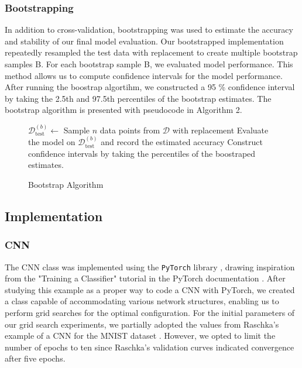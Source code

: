 \subsubsection{Bootstrapping}

In addition to cross-validation, bootstrapping was used to estimate the accuracy and stability of our final model evaluation. Our bootstrapped implementation repeatedly resampled the test data with replacement to create multiple bootstrap samples B. For each bootstrap sample B, we evaluated model performance. This method allows us to compute confidence intervals for the model performance. After running the boostrap algortihm, we constructed a 95 \% confidence interval by taking the 2.5th and 97.5th percentiles of the bootstrap estimates. The bootstrap algorithm is presented with pseudocode in Algorithm 2. \cite{hastie2009elements}

\begin{figure}[H]
    \begin{algorithm}[H]
    \caption{Bootstrap Algorithm}
    \label{algo:bootstrap}
        \begin{algorithmic}[1]
                \State $\mathcal{D}^{(b)}_{\text{test}} \gets$ Sample $n$ data points from $\mathcal{D}$ with replacement
                \State Evaluate the model on $\mathcal{D}^{(b)}_{\text{test}}$ and record the estimated accuracy
            \EndFor
            \State Construct confidence intervals by taking the percentiles of the boostraped estimates.
            \EndProcedure
        \end{algorithmic}
    \end{algorithm}
\end{figure}

\subsection{Implementation}
\subsubsection{CNN}
The CNN class was implemented using the \texttt{PyTorch} library \cite{Paszke2019}, drawing inspiration from the "Training a Classifier" tutorial in the PyTorch documentation \cite{pytorch_cifar10_tutorial}. After studying this example as a proper way to code a CNN with PyTorch, we created a class capable of accommodating various network structures, enabling us to perform grid searches for the optimal configuration. For the initial parameters of our grid search experiments, we partially adopted the values from Raschka's example of a CNN for the MNIST dataset \cite{raschka2022machine}. However, we opted to limit the number of epochs to ten since Raschka's validation curves indicated convergence after five epochs. 

